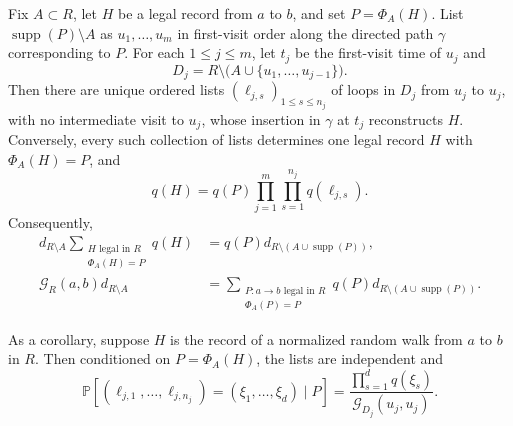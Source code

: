\documentclass[10pt,a4paper]{amsart}
\newcommand{\Gc}{\mathcal G}
\newcommand{\Prob}{\mathbb P}
\newcommand{\supp}{\operatorname{supp}}
\begin{document}
\begin{lemma}\label{lem:one-step}
Fix $A\subset R$,  let $H$ be a legal record from $a$ to $b$, and set
$P=\Phi_A(H)$.  List $\supp(P)\setminus A$ as $u_1,\ldots,u_m$ in first-visit
order along the directed path $\gamma$ corresponding to $P$. For each $1\le j\le m$, let $t_j$ be the first-visit time of $u_j$
and
\[
 D_j=R\setminus\bigl(A\cup\{u_1,\ldots,u_{j-1}\}\bigr).
\]
Then there are unique ordered lists $(\ell_{j,s})_{1\le s\le n_j}$ of loops in
$D_j$ from $u_j$ to $u_j$, with no intermediate visit to $u_j$, whose insertion
in $\gamma$ at $t_j$ reconstructs $H$.  Conversely, every such collection of lists determines one legal
record $H$ with $\Phi_A(H)=P$, and
\begin{equation}\label{eq:positive-fiber-weight}
 q(H)=q(P)\prod_{j=1}^m\prod_{s=1}^{n_j}q(\ell_{j,s}).
\end{equation}
Consequently,
\begin{align}
 d_{R\setminus A}
 \sum_{\substack{H\text{ legal in }R\\\Phi_A(H)=P}}q(H)
 &=q(P)d_{R\setminus(A\cup\supp(P))},\label{eq:fiber}\\
 \Gc_R(a,b)d_{R\setminus A}
 &=\sum_{\substack{P:a\to b\text{ legal in }R\\\Phi_A(P)=P}}
 q(P)d_{R\setminus(A\cup\supp(P))}.\label{eq:one-step}
\end{align}

As a corollary, suppose $H$ is the record of a normalized random walk from $a$ to $b$ in $R$. Then conditioned on $P=\Phi_A(H)$, the lists are
independent and
\begin{equation}\label{eq:rooted-walk-law}
 \Prob[(\ell_{j,1},\ldots,\ell_{j,n_j})=(\xi_1,\ldots,\xi_d)\mid P]
 =\frac{\prod_{s=1}^d q(\xi_s)}{\Gc_{D_j}(u_j,u_j)}.
\end{equation}
\end{lemma}
\end{document}

